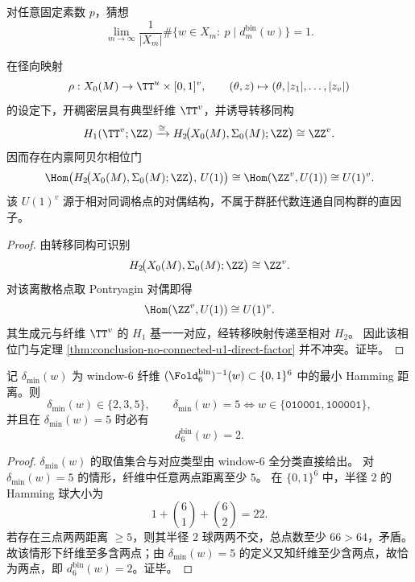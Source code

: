 \begin{conjecture}[典型纤维多重度的素数整除]\label{conj:conclusion-typical-fiber-prime-divisibility}
对任意固定素数 \(p\)，猜想
\[
\lim_{m\to\infty}\frac1{|X_m|}\#\{w\in X_m:\ p\mid d_m^{\mathrm{bin}}(w)\}=1.
\]
\end{conjecture}

\begin{theorem}\label{thm:conclusion-u1-from-relative-homology-dual}
在径向映射
\[
\rho:X_0(M)\to \TT^u\times[0,1]^v,\qquad
(\theta,z)\mapsto(\theta,|z_1|,\dots,|z_v|)
\]
的设定下，开稠密层具有典型纤维 \(\TT^v\)，并诱导转移同构
\[
H_1(\TT^v;\ZZ)
\xrightarrow{\cong}
H_2\!\bigl(X_0(M),\Sigma_0(M);\ZZ\bigr)
\cong
\ZZ^v.
\]
因而存在内禀阿贝尔相位门
\[
\Hom\!\left(H_2\!\bigl(X_0(M),\Sigma_0(M);\ZZ\bigr),\,U(1)\right)
\cong
\Hom(\ZZ^v,U(1))
\cong
U(1)^v.
\]
该 \(U(1)^v\) 源于相对同调格点的对偶结构，不属于群胚代数连通自同构群的直因子。
\end{theorem}
\begin{proof}
由转移同构可识别
\[
H_2\!\bigl(X_0(M),\Sigma_0(M);\ZZ\bigr)\cong \ZZ^v.
\]
对该离散格点取 Pontryagin 对偶即得
\[
\Hom(\ZZ^v,U(1))\cong U(1)^v.
\]
其生成元与纤维 \(\TT^v\) 的 \(H_1\) 基一一对应，经转移映射传递至相对 \(H_2\)。
因此该相位门与定理 \ref{thm:conclusion-no-connected-u1-direct-factor} 并不冲突。证毕。
\end{proof}

\begin{proposition}[纤维内最大分离度强制双态]\label{prop:conclusion-window6-delta5-implies-twofold}
记 \(\delta_{\min}(w)\) 为 window-\(6\) 纤维
\(
(\Fold_6^{\mathrm{bin}})^{-1}(w)\subset\{0,1\}^6
\)
中的最小 Hamming 距离。则
\[
\delta_{\min}(w)\in\{2,3,5\},\qquad
\delta_{\min}(w)=5
\Longleftrightarrow
w\in\{\texttt{010001},\texttt{100001}\},
\]
并且在 \(\delta_{\min}(w)=5\) 时必有
\[
d_6^{\mathrm{bin}}(w)=2.
\]
\end{proposition}
\begin{proof}
\(\delta_{\min}(w)\) 的取值集合与对应类型由 window-\(6\) 全分类直接给出。
对 \(\delta_{\min}(w)=5\) 的情形，纤维中任意两点距离至少 \(5\)。
在 \(\{0,1\}^6\) 中，半径 \(2\) 的 Hamming 球大小为
\[
1+\binom61+\binom62=22.
\]
若存在三点两两距离 \(\ge 5\)，则其半径 \(2\) 球两两不交，总点数至少 \(66>64\)，矛盾。
故该情形下纤维至多含两点；由 \(\delta_{\min}(w)=5\) 的定义又知纤维至少含两点，故恰为两点，即 \(d_6^{\mathrm{bin}}(w)=2\)。证毕。
\end{proof}

